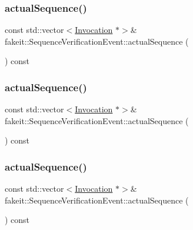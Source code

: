 \subsubsection{\texorpdfstring{actualSequence()}{actualSequence()}\hspace{0.1cm}{\footnotesize\ttfamily [4/9]}}
{\footnotesize\ttfamily const std\+::vector$<$\mbox{\hyperlink{structfakeit_1_1Invocation}{Invocation}} $\ast$$>$\& fakeit\+::\+Sequence\+Verification\+Event\+::actual\+Sequence (\begin{DoxyParamCaption}{ }\end{DoxyParamCaption}) const\hspace{0.3cm}{\ttfamily [inline]}}

\mbox{\label{structfakeit_1_1SequenceVerificationEvent_aecdc4dac839dc16a96ee85b0d0297bed}} 
\subsubsection{\texorpdfstring{actualSequence()}{actualSequence()}\hspace{0.1cm}{\footnotesize\ttfamily [5/9]}}
{\footnotesize\ttfamily const std\+::vector$<$\mbox{\hyperlink{structfakeit_1_1Invocation}{Invocation}} $\ast$$>$\& fakeit\+::\+Sequence\+Verification\+Event\+::actual\+Sequence (\begin{DoxyParamCaption}{ }\end{DoxyParamCaption}) const\hspace{0.3cm}{\ttfamily [inline]}}

\mbox{\label{structfakeit_1_1SequenceVerificationEvent_aecdc4dac839dc16a96ee85b0d0297bed}} 
\subsubsection{\texorpdfstring{actualSequence()}{actualSequence()}\hspace{0.1cm}{\footnotesize\ttfamily [6/9]}}
{\footnotesize\ttfamily const std\+::vector$<$\mbox{\hyperlink{structfakeit_1_1Invocation}{Invocation}} $\ast$$>$\& fakeit\+::\+Sequence\+Verification\+Event\+::actual\+Sequence (\begin{DoxyParamCaption}{ }\end{DoxyParamCaption}) const\hspace{0.3cm}{\ttfamily [inline]}}


